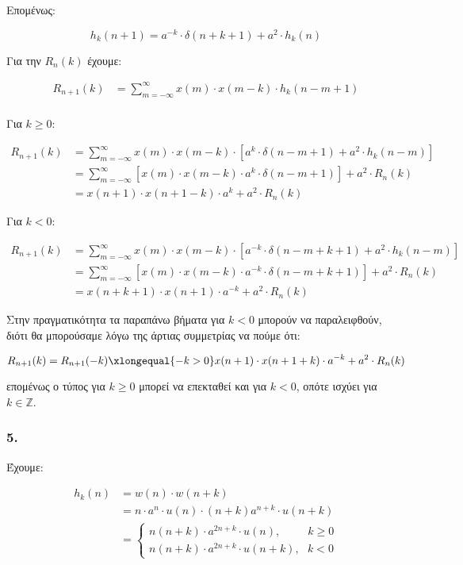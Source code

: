 \documentclass[12pt,a4paper]{article}
\begin{document}
		Επομένως:
		
		\[
			h_k(n+1) = a^{-k} \cdot \delta(n+k+1) + a^2 \cdot h_k(n)
		\]

		Για την $R_n(k)$ έχουμε:
		
		\begin{align*}
			R_{n+1}(k) &= \sum_{m=-\infty}^{\infty} x(m) \cdot x(m-k) \cdot h_k(n-m+1) \\
		\end{align*}

		Για $k \geq 0$:
		
		\begin{align*}
			R_{n+1}(k) &= \sum_{m=-\infty}^{\infty} x(m) \cdot x(m-k) \cdot \left[a^k \cdot \delta(n-m+1) + a^2 \cdot h_k(n-m)\right] \\
			&= \sum_{m=-\infty}^{\infty} \left[x(m) \cdot x(m-k) \cdot a^k \cdot \delta(n-m+1)\right] + a^2 \cdot R_n(k) \\
			&= x(n+1) \cdot x(n+1-k) \cdot a^k + a^2 \cdot R_n(k)
		\end{align*}
		
		Για $k < 0$:
		
		\begin{align*}
			R_{n+1}(k) &= \sum_{m=-\infty}^{\infty} x(m) \cdot x(m-k) \cdot \left[a^{-k} \cdot \delta(n-m+k+1) + a^2 \cdot h_k(n-m)\right] \\ 
			&= \sum_{m=-\infty}^{\infty} \left[x(m) \cdot x(m-k) \cdot a^{-k} \cdot \delta(n-m+k+1)\right] + a^2 \cdot R_n(k) \\ 
			&= x(n+k+1) \cdot x(n+1) \cdot a^{-k} + a^2 \cdot R_n(k)
		\end{align*}
		
		Στην πραγματικότητα τα παραπάνω βήματα για $k < 0$ μπορούν να παραλειφθούν, διότι θα μπορούσαμε λόγω της άρτιας συμμετρίας να πούμε ότι:
		
		\[
			R_{n+1}(k) = R_{n+1}(-k) \xlongequal{-k > 0} x(n+1) \cdot x(n+1+k) \cdot a^{-k} + a^2 \cdot R_n(k) 
		\] 
		
		επομένως ο τύπος για $k \geq 0 $ μπορεί να επεκταθεί και για $k < 0$, οπότε ισχύει για $k \in \mathbb{Z}$.
		
		\subsubsection*{5.} 
			Έχουμε:
			
			\begin{align*}
				h_k(n) &= w(n) \cdot w(n+k)  \\
				&= n \cdot a^n \cdot u(n) \cdot (n+k) a^{n+k} \cdot u(n+k) \\
				&= 
					\begin{cases}
						n(n+k) \cdot a^{2n+k} \cdot u(n), ~~~~~~~~~~~ k \geq 0 \\
						n(n+k) \cdot a^{2n+k} \cdot u(n+k), ~~~ k < 0
					\end{cases}
			\end{align*}
			
\end{document}
